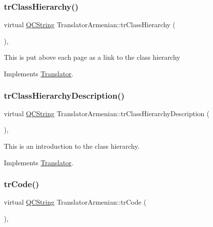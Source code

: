 \subsubsection{\texorpdfstring{trClassHierarchy()}{trClassHierarchy()}}
{\footnotesize\ttfamily virtual \mbox{\hyperlink{class_q_c_string}{Q\+C\+String}} Translator\+Armenian\+::tr\+Class\+Hierarchy (\begin{DoxyParamCaption}{ }\end{DoxyParamCaption})\hspace{0.3cm}{\ttfamily [inline]}, {\ttfamily [virtual]}}

This is put above each page as a link to the class hierarchy 

Implements \mbox{\hyperlink{class_translator}{Translator}}.

\mbox{\label{class_translator_armenian_a2c62090bf34112508b67776c17184052}} 
\subsubsection{\texorpdfstring{trClassHierarchyDescription()}{trClassHierarchyDescription()}}
{\footnotesize\ttfamily virtual \mbox{\hyperlink{class_q_c_string}{Q\+C\+String}} Translator\+Armenian\+::tr\+Class\+Hierarchy\+Description (\begin{DoxyParamCaption}{ }\end{DoxyParamCaption})\hspace{0.3cm}{\ttfamily [inline]}, {\ttfamily [virtual]}}

This is an introduction to the class hierarchy. 

Implements \mbox{\hyperlink{class_translator}{Translator}}.

\mbox{\label{class_translator_armenian_a7321bb853bb4da9ef5a2890d5911b11f}} 
\subsubsection{\texorpdfstring{trCode()}{trCode()}}
{\footnotesize\ttfamily virtual \mbox{\hyperlink{class_q_c_string}{Q\+C\+String}} Translator\+Armenian\+::tr\+Code (\begin{DoxyParamCaption}{ }\end{DoxyParamCaption})\hspace{0.3cm}{\ttfamily [inline]}, {\ttfamily [virtual]}}

